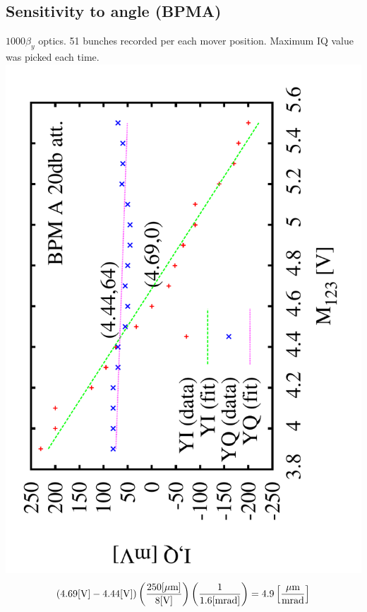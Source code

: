 \documentclass[a4paper,11pt]{book}
\begin{document}
\subsection{Sensitivity to angle (BPMA)}
$1000\beta_y$ optics. 51 bunches recorded per each mover position. Maximum IQ value was picked each time.\\
\centering
 \includegraphics[scale=0.3,angle=-90]{image01_sense.pdf}\\
 \begin{equation}
  (4.69[\text{V}]-4.44[\text{V}])\left(\frac{250[\mu\text{m}]}{8[\text{V}]}\right)\left(\frac{1}{1.6[\text{mrad}]}\right)=4.9\left[\frac{\mu\textmd{m}}{\textmd{mrad}}\right]
 \end{equation}
\raggedright
\end{document}
